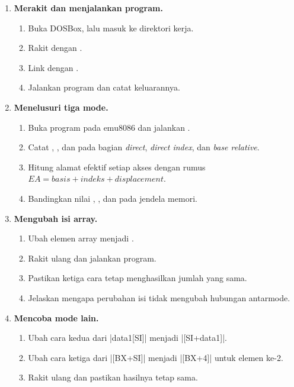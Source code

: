 \begin{enumerate}
    \item \textbf{Merakit dan menjalankan program.}
    \begin{enumerate}
        \item Buka DOSBox, lalu masuk ke direktori kerja.
        \item Rakit dengan .
        \item Link dengan .
        \item Jalankan program dan catat keluarannya.
    \end{enumerate}

    \item \textbf{Menelusuri tiga mode.}
    \begin{enumerate}
        \item Buka program pada emu8086 dan jalankan
              .
        \item Catat , , dan  pada bagian
              \textit{direct}, \textit{direct index}, dan
              \textit{base relative}.
        \item Hitung alamat efektif setiap akses dengan rumus
              $EA = basis + indeks + displacement$.
        \item Bandingkan nilai , , dan
               pada jendela memori.
    \end{enumerate}

    \item \textbf{Mengubah isi array.}
    \begin{enumerate}
        \item Ubah elemen array menjadi .
        \item Rakit ulang dan jalankan program.
        \item Pastikan ketiga cara tetap menghasilkan jumlah yang
              sama.
        \item Jelaskan mengapa perubahan isi tidak mengubah
              hubungan antarmode.
    \end{enumerate}

    \item \textbf{Mencoba mode lain.}
    \begin{enumerate}
        \item Ubah cara kedua dari \lstasm|data1[SI]| menjadi
              \lstasm|[SI+data1]|.
        \item Ubah cara ketiga dari \lstasm|[BX+SI]| menjadi
              \lstasm|[BX+4]| untuk elemen ke-2.
        \item Rakit ulang dan pastikan hasilnya tetap sama.
    \end{enumerate}


\end{enumerate}
